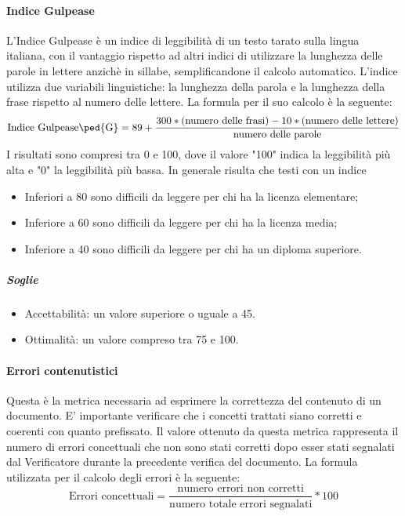\paragraph{Indice Gulpease}
L'{Indice Gulpease} è un indice di leggibilità di un testo tarato sulla lingua italiana, con il vantaggio rispetto ad altri indici di utilizzare la lunghezza delle parole in lettere anzichè in sillabe, semplificandone il calcolo automatico. L'indice utilizza due variabili linguistiche: la lunghezza della parola e la lunghezza della frase rispetto al numero delle lettere.
\newline La formula per il suo calcolo è la seguente:
\begin{displaymath}
\mbox{{Indice Gulpease}\ped{G}}= 89+\frac{300*\mbox{(numero delle frasi)}-10*\mbox{(numero delle lettere)}}{\mbox{numero delle parole}}
\end{displaymath}
I risultati sono compresi tra 0 e 100, dove il valore "100" indica la leggibilità più alta e "0" la leggibilità più bassa. In generale risulta che testi con un indice
\begin{itemize}
	\item Inferiori a 80 sono difficili da leggere per chi ha la licenza elementare;
	\item Inferiore a 60 sono difficili da leggere per chi ha la licenza media;
	\item Inferiore a 40 sono difficili da leggere per chi ha un diploma superiore.
\end{itemize}

\subparagraph{Soglie}
\begin{itemize}
\item Accettabilità: un valore superiore o uguale a 45.
\item Ottimalità: un valore compreso tra 75 e 100.
\end{itemize}

\paragraph{Errori contenutistici}
Questa è la metrica necessaria ad esprimere la correttezza del contenuto di un documento. E' importante verificare che i concetti trattati siano corretti e coerenti con quanto prefissato. Il valore ottenuto da questa metrica rappresenta il numero di errori concettuali che non sono stati corretti dopo esser stati segnalati dal {Verificatore} durante la precedente verifica del documento.
\newline La formula utilizzata per il calcolo degli errori è la seguente:
\begin{displaymath}
\mbox{Errori concettuali}=\frac{\mbox{numero errori non corretti}}{\mbox{numero totale errori segnalati}}*100
\end{displaymath}

